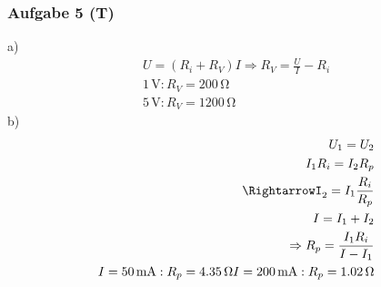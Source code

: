 \documentclass{article}
\begin{document}
\subsubsection*{Aufgabe 5 (T)}
a)\begin{eqnarray*}
    U=(R_i+R_V)I \Rightarrow R_V = \frac{U}{I}-R_i\\
    1\,\mathrm{V}: R_V = 200\,\mathrm{\Omega}\\
    5\,\mathrm{V}: R_V = 1200\,\mathrm{\Omega}
\end{eqnarray*}
b)\begin{eqnarray*}
    U_1 = U_2\\
    I_1R_i = I_2R_p\\
    \RightarrowI_2=I_1\frac{R_i}{R_p}\\
    I=I_1+I_2\\
    \Rightarrow R_p = \frac{I_1R_i}{I - I_1}\\
    I=50\,\mathrm{mA}:  R_p = 4.35\,\mathrm{\Omega}
    I=200\,\mathrm{mA}:  R_p = 1.02\,\mathrm{\Omega}
\end{eqnarray*}
\end{document}
